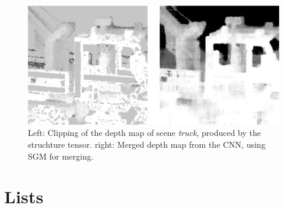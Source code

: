 \documentclass  [
  paper    = a4,
  BCOR     = 10mm,
  twoside,
  fontsize = 12pt,
  fleqn,
  toc      = bibnumbered,
  toc      = listofnumbered,
  numbers  = noendperiod,
  headings = normal,
  listof   = leveldown,
  version  = 3.03
]                                       {scrreprt}
\begin{document}
\begin{appendix}
\begin{figure}
	\centering
	\includegraphics[width=0.7\linewidth]{images/truck_cnndata}
	\caption[Truck with CNN +SGM]{Left: Clipping of the depth map of scene \textit{truck}, produced by the struchture tensor. right: Merged depth map from the CNN, using SGM for merging. }
	\label{fig:depthcnntruck}
\end{figure}

\end{appendix}
\chapter{Lists}
\listoffigures
\listoftables
{}


    
\end{document}
